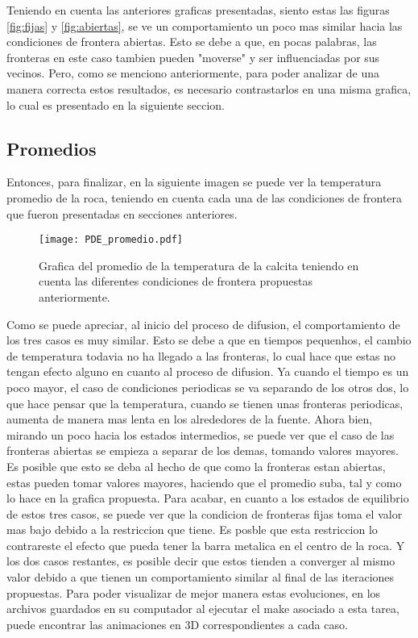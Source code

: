 \documentclass[11pt]{article}
\begin{document}
		Teniendo en cuenta las anteriores graficas presentadas, siento estas las figuras \ref{fig:fijas} y \ref{fig:abiertas}, se ve un comportamiento un poco mas similar hacia las condiciones 			de frontera abiertas. Esto se debe a que, en pocas palabras, las fronteras en este caso tambien pueden "moverse" y ser influenciadas por sus vecinos. Pero, como se menciono 			anteriormente, para poder analizar de una manera correcta estos resultados, es necesario contrastarlos en una misma grafica, lo cual es presentado en la siguiente seccion. 
	
	\subsection{Promedios}

		Entonces, para finalizar, en la siguiente imagen se puede ver la temperatura promedio de la roca, teniendo en cuenta cada una de las condiciones de frontera que fueron presentadas en 			secciones anteriores. 
		\begin{figure}[H]
    			\centering
    				\texttt{[image: PDE\_promedio.pdf]}
    				\caption{Grafica del promedio de la temperatura de la calcita teniendo en cuenta las diferentes condiciones de frontera propuestas anteriormente.}
    			\label{fig:p}
		\end{figure}

		Como se puede apreciar, al inicio del proceso de difusion, el comportamiento de los tres casos es muy similar. Esto se debe a que en tiempos pequenhos, el cambio de temperatura todavia no ha llegado a las fronteras, lo cual hace que estas no tengan efecto alguno en cuanto al proceso de difusion. Ya cuando el tiempo es un poco mayor, el caso de condiciones periodicas se va separando de los otros dos, lo que hace pensar que la temperatura, cuando se tienen unas fronteras periodicas, aumenta de manera mas lenta en los alrededores de la fuente. Ahora bien, mirando un poco hacia los estados intermedios, se puede ver que el caso de las fronteras abiertas se empieza a separar de los demas, tomando valores mayores. Es posible que esto se deba al hecho de que como la fronteras estan abiertas, estas pueden tomar valores mayores, haciendo que el promedio suba, tal y como lo hace en la grafica propuesta. Para acabar, en cuanto a los estados de equilibrio de estos tres casos, se puede ver que la condicion de fronteras fijas toma el valor mas bajo debido a la restriccion que tiene. Es posble que esta restriccion lo contrareste el efecto que pueda tener la barra metalica en el centro de la roca. Y los dos casos restantes, es posible decir que estos tienden a converger al mismo valor debido a que tienen un comportamiento similar al final de las iteraciones propuestas. Para poder visualizar de mejor manera estas evoluciones, en los archivos guardados en su computador al ejecutar el make asociado a esta tarea, puede encontrar las animaciones en 3D correspondientes a cada caso.
	
\end{document}
